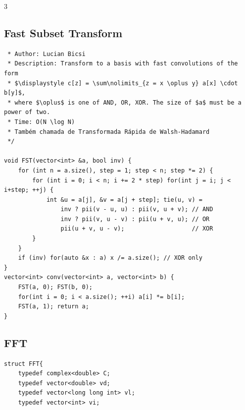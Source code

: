 \documentclass[9pt, a4paper, notitlepage]{extreport}
\begin{document}
\begin{multicols}{3}
\subsection{Fast Subset Transform}
\begin{verbatim}
 * Author: Lucian Bicsi
 * Description: Transform to a basis with fast convolutions of the form
 * $\displaystyle c[z] = \sum\nolimits_{z = x \oplus y} a[x] \cdot b[y]$,
 * where $\oplus$ is one of AND, OR, XOR. The size of $a$ must be a power of two.
 * Time: O(N \log N)
 * Também chamada de Transformada Rápida de Walsh-Hadamard
 */

void FST(vector<int> &a, bool inv) {
	for (int n = a.size(), step = 1; step < n; step *= 2) {
		for (int i = 0; i < n; i += 2 * step) for(int j = i; j < i+step; ++j) {
			int &u = a[j], &v = a[j + step]; tie(u, v) =
				inv ? pii(v - u, u) : pii(v, u + v); // AND
				inv ? pii(v, u - v) : pii(u + v, u); // OR
				pii(u + v, u - v);                   // XOR
		}
	}
	if (inv) for(auto &x : a) x /= a.size(); // XOR only
}
vector<int> conv(vector<int> a, vector<int> b) {
	FST(a, 0); FST(b, 0);
	for(int i = 0; i < a.size(); ++i) a[i] *= b[i];
	FST(a, 1); return a;
}
\end{verbatim}

\subsection{FFT}
\begin{verbatim}
struct FFT{
    typedef complex<double> C;
    typedef vector<double> vd;
    typedef vector<long long int> vl;
    typedef vector<int> vi;
 

\end{verbatim}
\end{multicols}
\end{document}
